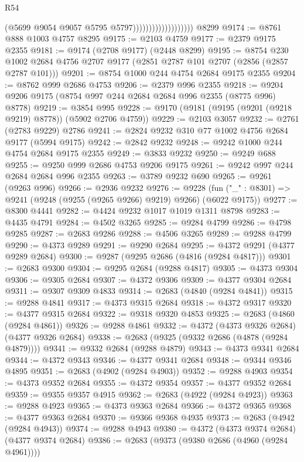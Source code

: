 \begin{lexlean}{R54}
\begin{coremodule}
                                        (@5699 @9054 @9057 @5795 @5797)))))))))))))))))))
    @8299
@9174 := @8761 @888 @1003 @4757 @8295
@9175 := @2103 @4759
@9177 := @2379 @9175 @2355
@9181 := @9174 (@2708 @9177) (@2448 @8299)
@9195 := @8754
    @230
    @1002
    @2684
    @4756
    @2707
    @9177
    (@2851 @2787 @101 @2707 (@2856 (@2857 @2787 @101)))
@9201 := @8754 @1000 @244 @4754 @2684 @9175 @2355
@9204 := @8762 @999 @2686 @4753
@9206 := @2379 @996 @2355
@9218 := @9204 @9206 @9175 (@8754 @997 @244 @2684 @2684 @996 @2355 (@8775 @996) @8778)
@9219 := @3854 @995
@9228 := @9170 (@9181 (@9195 (@9201 (@9218 @9219) @8778)) (@5902 @2706 @4759))
@9229 := @2103 @3057
@9232 := @2761 (@2783 @9229) @2786
@9241 := @2824 @9232 @310 @77 @1002 @4756 @2684 @9177 (@5994 @9175)
@9242 := @2842 @9232
@9248 := @9242 @1000 @244 @4754 @2684 @9175 @2355
@9249 := @3833 @9232
@9250 := @9249 @688
@9255 := @9250 @999 @2686 @4753 @9206 @9175
@9261 := @9242 @997 @244 @2684 @2684 @996 @2355
@9263 := @3789 @9232 @690
@9265 := @9261 (@9263 @996)
@9266 := @2936 @9232
@9276 := @9228 (fun ("_" : @8301) => @9241 (@9248 (@9255 (@9265 @9266) @9219) @9266) (@6022 @9175))
@9277 := @8300 @4441
@9282 := @4424 @9232 @1017 @1019 @1311 @8798
@9283 := @4435 @4791
@9284 := @4502 @3265
@9285 := @9284 @4799
@9286 := @4798 @9285
@9287 := @2683 @9286
@9288 := @4506 @3265
@9289 := @9288 @4799
@9290 := @4373 @9289
@9291 := @9290 @2684
@9295 := @4372 @9291 (@4377 @9289 @2684)
@9300 := @9287 (@9295 @2686 (@4816 (@9284 @4817)))
@9301 := @2683 @9300
@9304 := @9295 @2684 (@9288 @4817)
@9305 := @4373 @9304
@9306 := @9305 @2684
@9307 := @4372 @9306
@9309 := @4377 @9304 @2684
@9311 := @9307 @9309 @4833
@9314 := @2683 (@4840 (@9284 @4841))
@9315 := @9288 @4841
@9317 := @4373 @9315 @2684
@9318 := @4372 @9317
@9320 := @4377 @9315 @2684
@9322 := @9318 @9320 @4853
@9325 := @2683 (@4860 (@9284 @4861))
@9326 := @9288 @4861
@9332 := @4372 (@4373 @9326 @2684) (@4377 @9326 @2684)
@9338 := @2683 (@9325 (@9332 @2686 (@4878 (@9284 @4879))))
@9341 := @9332 @2684 (@9288 @4879)
@9343 := @4373 @9341 @2684
@9344 := @4372 @9343
@9346 := @4377 @9341 @2684
@9348 := @9344 @9346 @4895
@9351 := @2683 (@4902 (@9284 @4903))
@9352 := @9288 @4903
@9354 := @4373 @9352 @2684
@9355 := @4372 @9354
@9357 := @4377 @9352 @2684
@9359 := @9355 @9357 @4915
@9362 := @2683 (@4922 (@9284 @4923))
@9363 := @9288 @4923
@9365 := @4373 @9363 @2684
@9366 := @4372 @9365
@9368 := @4377 @9363 @2684
@9370 := @9366 @9368 @4935
@9373 := @2683 (@4942 (@9284 @4943))
@9374 := @9288 @4943
@9380 := @4372 (@4373 @9374 @2684) (@4377 @9374 @2684)
@9386 := @2683 (@9373 (@9380 @2686 (@4960 (@9284 @4961))))

\end{coremodule}
\end{lexlean}
